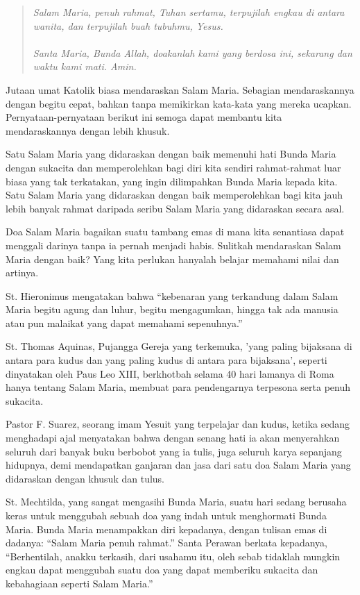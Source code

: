 
\begin{quote}
\textit{Salam Maria, penuh rahmat, Tuhan sertamu,
terpujilah engkau di antara wanita, dan terpujilah buah tubuhmu, Yesus.
\\{~}\\
Santa Maria, Bunda Allah, doakanlah kami yang berdosa ini,
sekarang dan waktu kami mati. Amin.}
\end{quote}

Jutaan umat Katolik biasa mendaraskan Salam Maria. Sebagian mendaraskannya dengan begitu cepat, bahkan tanpa memikirkan kata-kata yang mereka ucapkan. Pernyataan-pernyataan berikut ini semoga dapat membantu kita mendaraskannya dengan lebih khusuk.
 
Satu Salam Maria yang didaraskan dengan baik memenuhi hati Bunda Maria dengan sukacita dan memperolehkan bagi diri kita sendiri rahmat-rahmat luar biasa yang tak terkatakan, yang ingin dilimpahkan Bunda Maria kepada kita. Satu Salam Maria yang didaraskan dengan baik memperolehkan bagi kita jauh lebih banyak rahmat daripada seribu Salam Maria yang didaraskan secara asal.
 
Doa Salam Maria bagaikan suatu tambang emas di mana kita senantiasa dapat menggali darinya tanpa ia pernah menjadi habis. Sulitkah mendaraskan Salam Maria dengan baik? Yang kita perlukan hanyalah belajar memahami nilai dan artinya.
 
St. Hieronimus mengatakan bahwa “kebenaran yang terkandung dalam Salam Maria begitu agung dan luhur, begitu mengagumkan, hingga tak ada manusia atau pun malaikat yang dapat memahami sepenuhnya.”
 
St. Thomas Aquinas, Pujangga Gereja yang terkemuka, 'yang paling bijaksana di antara para kudus dan yang paling kudus di antara para bijaksana', seperti dinyatakan oleh Paus Leo XIII, berkhotbah selama 40 hari lamanya di Roma hanya tentang Salam Maria, membuat para pendengarnya terpesona serta penuh sukacita.
 
Pastor F. Suarez, seorang imam Yesuit yang terpelajar dan kudus, ketika sedang menghadapi ajal menyatakan bahwa dengan senang hati ia akan menyerahkan seluruh dari banyak buku berbobot yang ia tulis, juga seluruh karya sepanjang hidupnya, demi mendapatkan ganjaran dan jasa dari satu doa Salam Maria yang didaraskan dengan khusuk dan tulus.


St. Mechtilda, yang sangat mengasihi Bunda Maria, suatu hari sedang berusaha keras untuk menggubah sebuah doa yang indah untuk menghormati Bunda Maria. Bunda Maria menampakkan diri kepadanya, dengan tulisan emas di dadanya: “Salam Maria penuh rahmat.” Santa Perawan berkata kepadanya, “Berhentilah, anakku terkasih, dari usahamu itu, oleh sebab tidaklah mungkin engkau dapat menggubah suatu doa yang dapat memberiku sukacita dan kebahagiaan seperti Salam Maria.”


